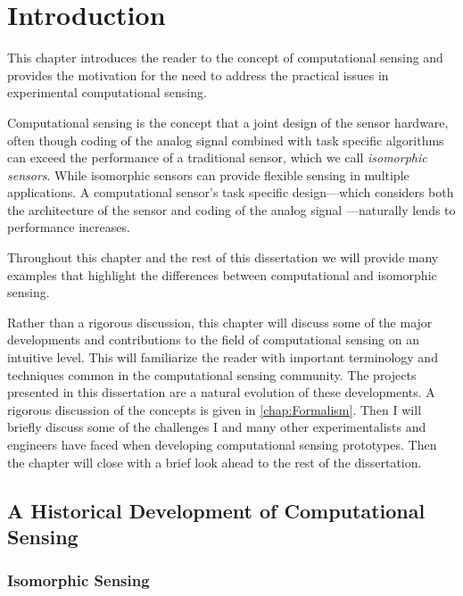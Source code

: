 \chapter{Introduction}\label{sec:chIntrosecHistory}

This chapter introduces the reader to the concept of computational sensing and provides the motivation for the need to address the practical issues in experimental computational sensing. 

Computational sensing is the concept that a joint design of the sensor hardware, often though coding of the analog signal combined with task specific algorithms can exceed the performance of a traditional sensor, which we call \emph{isomorphic sensors}. While isomorphic sensors can provide flexible sensing in multiple applications. A computational sensor's task specific design---which considers both the architecture of the sensor and coding of the analog signal ---naturally lends to performance increases. 

Throughout this chapter and the rest of this dissertation we will provide many examples that highlight the differences between computational and isomorphic sensing. 

Rather than a rigorous discussion, this chapter will discuss some of the major developments and contributions to the field of computational sensing on an intuitive level. This will familiarize the reader with important terminology and techniques common in the computational sensing community. The projects presented in this dissertation are a natural evolution of these developments. A rigorous discussion of the concepts is given in \autoref{chap:Formalism}. Then I will briefly discuss some of the challenges I and many other experimentalists and engineers have faced when developing computational sensing prototypes. Then the chapter will close with a brief look ahead to the rest of the dissertation. 



\section{A Historical Development of Computational Sensing}\label{sec:chIntrosecHistory}

\subsection{Isomorphic Sensing}

